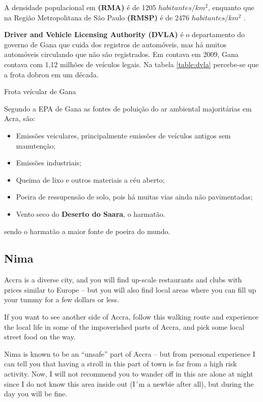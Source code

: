A densidade populacional em \textbf{(RMA)} é de 1205 $habitantes/km^2$, 
enquanto que na Região Metropolitana de São Paulo \textbf{(RMSP)} é de 
2476 $habitantes/km^2$ \citep{ibge2011}. 

\textbf{Driver and Vehicle Licensing Authority (DVLA)} é o
departamento do governo de Gana que cuida dos registros de automóveis, 
mas há muitos automóveis circulando que não são registrados. 
Em contava em 2009, Gana contava com 1,12 milhões de veículos legais. 
Na tabela \ref{table:dvla} percebe-se que a frota dobrou em um década.

\begin{table}[H]
 \centering
  
  \caption{Frota veícular de Gana \citep{dvla} \label{table:dvla}}
\end{table}

Segundo a EPA de Gana \citep{epagh} as fontes de poluição do ar ambiental 
majoritárias em Acra, são:

\begin{itemize}
  \item Emissões veiculares, principalmente emissões de veículos antigos sem manutenção;
  \item Emissões industriais;
  \item Queima de lixo e outros materiais a céu aberto;
  \item Poeira de ressupensão de solo, pois há muitas vias ainda não pavimentadas;
  \item Vento seco do \textbf{Deserto do Saara}, o harmatão.
\end{itemize}
sendo o harmatão a maior fonte de poeira do mundo.
\subsection{Nima}



Accra is a diverse city, and you will find up-scale restaurants and clubs with prices similar to Europe – but you will also find local areas where you can fill up your tummy for a few dollars or less.

If you want to see another side of Accra, follow this walking route and experience the local life in some of the impoverished parts of Accra, and pick some local street food on the way.

 

Nima is known to be an “unsafe” part of Accra – but from personal experience I can tell you that having a stroll in this part of town is far from a high risk activity. Now, I will not recommend you to wander off in this are alone at night since I do not know this area inside out (I´m a newbie after all), but during the day you will be fine.

